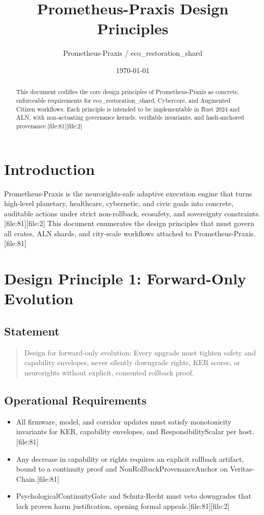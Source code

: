 \documentclass[11pt]{article}
\title{Prometheus-Praxis Design Principles}
\author{Prometheus-Praxis / eco\_restoration\_shard}
\date{\today}
\begin{document}
\maketitle

\begin{abstract}
This document codifies the core design principles of Prometheus-Praxis as concrete, enforceable requirements for eco\_restoration\_shard, Cybercore, and Augmented Citizen workflows. Each principle is intended to be implementable in Rust 2024 and ALN, with non-actuating governance kernels, verifiable invariants, and hash-anchored provenance.[file:81][file:2]
\end{abstract}

\section{Introduction}

Prometheus-Praxis is the neurorights-safe adaptive execution engine that turns high-level planetary, healthcare, cybernetic, and civic goals into concrete, auditable actions under strict non-rollback, ecosafety, and sovereignty constraints.[file:81][file:2]
This document enumerates the design principles that must govern all crates, ALN shards, and city-scale workflows attached to Prometheus-Praxis.[file:81]

\section{Design Principle 1: Forward-Only Evolution}

\subsection{Statement}

\begin{quote}
Design for forward-only evolution: Every upgrade must tighten safety and capability envelopes, never silently downgrade rights, KER scores, or neurorights without explicit, consented rollback proof.
\end{quote}

\subsection{Operational Requirements}

\begin{itemize}[nosep]
  \item All firmware, model, and corridor updates must satisfy monotonicity invariants for KER, capability envelopes, and ResponsibilityScalar per host.[file:81]
  \item Any decrease in capability or rights requires an explicit rollback artifact, bound to a continuity proof and NonRollbackProvenanceAnchor on Veritas-Chain.[file:81]
  \item PsychologicalContinuityGate and Schutz-Recht must veto downgrades that lack proven harm justification, opening formal appeals.[file:81][file:2]
\end{itemize}
\end{document}
